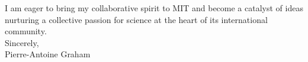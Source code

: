 \documentclass[12pt]{article}
\begin{document}
I am eager to bring my collaborative spirit to MIT and become a catalyst of ideas nurturing a collective passion for science at the heart of its international community. \\[0.3cm]

Sincerely, \\

Pierre-Antoine Graham
\end{document}

